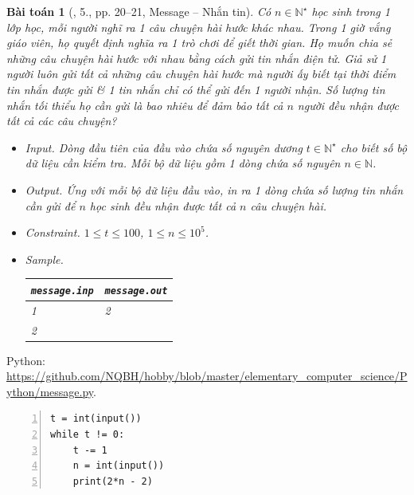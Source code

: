 \documentclass{article}
\newtheorem{baitoan}{Bài toán}
\begin{document}
\begin{baitoan}[\cite{Duc_200_BT_Python}, 5., pp. 20--21, Message -- Nhắn tin]
	Có $n\in\mathbb{N}^\star$ học sinh trong 1 lớp học, mỗi người nghĩ ra 1 câu chuyện hài hước khác nhau. Trong 1 giờ vắng giáo viên, họ quyết định nghĩa ra 1 trò chơi để giết thời gian. Họ muốn chia sẻ những câu chuyện hài hước với nhau bằng cách gửi tin nhắn điện tử. Giả sử 1 người luôn gửi tất cả những câu chuyện hài hước mà người ấy biết tại thời điểm tin nhắn được gửi \& 1 tin nhắn chỉ có thể gửi đến 1 người nhận. Số lượng tin nhắn tối thiểu họ cần gửi là bao nhiêu để đảm bảo tất cả $n$ người đều nhận được tất cả các câu chuyện?
	\begin{itemize}
		\item {\sf Input.} Dòng đầu tiên của đầu vào chứa số nguyên dương $t\in\mathbb{N}^\star$ cho biết số bộ dữ liệu cần kiểm tra. Mỗi bộ dữ liệu gồm 1 dòng chứa số nguyên $n\in\mathbb{N}$.
		\item {\sf Output.} Ứng với mỗi bộ dữ liệu đầu vào, in ra 1 dòng chứa số lượng tin nhắn cần gửi để $n$ học sinh đều nhận được tất cả $n$ câu chuyện hài.
		\item {\sf Constraint.} $1\le t\le100$, $1\le n\le10^5$.
		\item {\sf Sample.}
		\begin{table}[H]
			\centering
			\begin{tabular}{|l|l|}
				\hline
				{\tt message.inp} & {\tt message.out} \\
				\hline
				1 & 2 \\
				2 & \\
				\hline
			\end{tabular}
		\end{table}
	\end{itemize}
\end{baitoan}

Python: \url{https://github.com/NQBH/hobby/blob/master/elementary_computer_science/Python/message.py}.
\begin{Verbatim}[numbers=left,xleftmargin=5mm]
t = int(input())
while t != 0:
    t -= 1
    n = int(input())
    print(2*n - 2)
\end{Verbatim}
\end{document}
